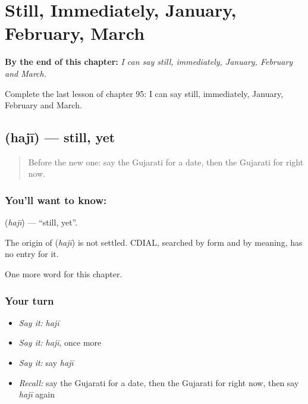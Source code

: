 
\chapter{Still, Immediately, January, February, March}
\label{ch:gu-still-immediately-january-february-march}

\begin{chapteropening}
\textbf{By the end of this chapter:} \emph{I can say still, immediately, January, February and March.}

Complete the last lesson of chapter 95: I can say still, immediately, January, February and March.
\end{chapteropening}

\section[\texorpdfstring{\gu{હજી} (hajī)}{હજી (hajī)}]{ (hajī) — still, yet}

\label{lesson:GU-C95-haji}



\begin{quote}
Before the new one: say the Gujarati for a date, then the Gujarati for right now.
\end{quote}

\subsection*{You'll want to know: }
\textbf{} (\emph{hajī}) — \textquotedblleft{}still, yet\textquotedblright{}.

\begin{cousinweb}
The origin of \textbf{} (\emph{hajī}) is not settled. CDIAL, searched by form and by meaning, has no entry for it.
\end{cousinweb}

\begin{grammarlens}[title={What you've built}]
One more word for this chapter.
\end{grammarlens}

\subsection*{Your turn}
\begin{itemize}
\raggedright
  \item \emph{Say it:} \emph{hajī}
  \item \emph{Say it:} \emph{hajī}, once more
  \item \emph{Say it:} say \emph{hajī}
  \item \emph{Recall:} say the Gujarati for a date, then the Gujarati for right now, then say \emph{hajī} again
\end{itemize}

